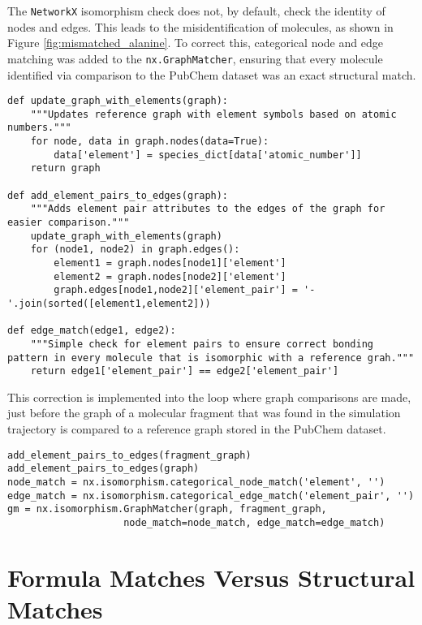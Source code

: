 The \verb|NetworkX| isomorphism check does not, by default, check the identity of nodes and edges.
This leads to the misidentification of molecules, as shown in Figure \ref{fig:mismatched_alanine}.
To correct this, categorical node and edge matching was added to the \verb|nx.GraphMatcher|, ensuring that every molecule identified via comparison to the PubChem dataset was an exact structural match. \bigskip

\begin{lstlisting}
def update_graph_with_elements(graph):
    """Updates reference graph with element symbols based on atomic numbers."""
    for node, data in graph.nodes(data=True):
        data['element'] = species_dict[data['atomic_number']]
    return graph

def add_element_pairs_to_edges(graph):
    """Adds element pair attributes to the edges of the graph for easier comparison."""
    update_graph_with_elements(graph)
    for (node1, node2) in graph.edges():
        element1 = graph.nodes[node1]['element']
        element2 = graph.nodes[node2]['element']
        graph.edges[node1,node2]['element_pair'] = '-'.join(sorted([element1,element2]))

def edge_match(edge1, edge2):
    """Simple check for element pairs to ensure correct bonding pattern in every molecule that is isomorphic with a reference grah."""
    return edge1['element_pair'] == edge2['element_pair']            
\end{lstlisting}

This correction is implemented into the loop where graph comparisons are made, just before the graph of a molecular fragment that was found in the simulation trajectory is compared to a reference graph stored in the PubChem dataset. \bigskip

\begin{lstlisting}
add_element_pairs_to_edges(fragment_graph)
add_element_pairs_to_edges(graph)
node_match = nx.isomorphism.categorical_node_match('element', '')
edge_match = nx.isomorphism.categorical_edge_match('element_pair', '')
gm = nx.isomorphism.GraphMatcher(graph, fragment_graph,
                    node_match=node_match, edge_match=edge_match)
\end{lstlisting}


\chapter{Formula Matches Versus Structural Matches}
\label{appendix:frag_vs_mol}

